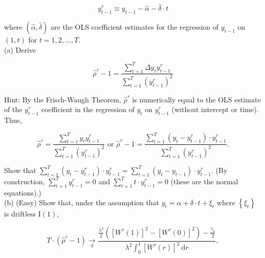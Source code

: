 \documentclass[10pt]{article}
\begin{document}
\begin{equation*}
y_{t-1}^{\tau} \equiv y_{t-1}-\hat{\alpha}-\hat{\delta} \cdot t \tag{8}
\end{equation*}


where $(\hat{\alpha}, \hat{\delta})$ are the OLS coefficient estimates for the regression of $y_{t-1}$ on $(1, t)$ for $t=1,2, \ldots, T$.\\
(a) Derive


\begin{equation*}
\hat{\rho}^{\tau}-1=\frac{\sum_{t=1}^{T} \Delta y_{t} y_{t-1}^{\tau}}{\sum_{t=1}^{T}\left(y_{t-1}^{\tau}\right)^{2}} \tag{9}
\end{equation*}


Hint: By the Frisch-Waugh Theorem, $\hat{\rho}^{\tau}$ is numerically equal to the OLS estimate of the $y_{t-1}^{\tau}$ coefficient in the regression of $y_{t}$ on $y_{t-1}^{\tau}$ (without intercept or time). Thus,


\begin{equation*}
\hat{\rho}^{\tau}=\frac{\sum_{t=1}^{T} y_{t} y_{t-1}^{\tau}}{\sum_{t=1}^{T}\left(y_{t-1}^{\tau}\right)^{2}} \text { or } \hat{\rho}^{\tau}-1=\frac{\sum_{t=1}^{T}\left(y_{t}-y_{t-1}^{\tau}\right) \cdot y_{t-1}^{\tau}}{\sum_{t=1}^{T}\left(y_{t-1}^{\tau}\right)^{2}} . \tag{10}
\end{equation*}


Show that $\sum_{t=1}^{T}\left(y_{t}-y_{t-1}^{\tau}\right) \cdot y_{t-1}^{\tau}=\sum_{t=1}^{T}\left(y_{t}-y_{t-1}\right) \cdot y_{t-1}^{\tau}$. (By construction, $\sum_{t=1}^{T} y_{t-1}^{\tau}=0$ and $\sum_{t=1}^{T} t \cdot y_{t-1}^{\tau}=0$ (these are the normal equations).)\\
(b) (Easy) Show that, under the assumption that $y_{t}=\alpha+\delta \cdot t+\xi_{t}$ where $\left\{\xi_{t}\right\}$ is driftless $\mathrm{I}(1)$,


\begin{equation*}
T \cdot\left(\hat{\rho}^{\tau}-1\right) \underset{\mathrm{d}}{\rightarrow} \frac{\frac{\lambda^{2}}{2}\left(\left[W^{\tau}(1)\right]^{2}-\left[W^{\tau}(0)\right]^{2}\right)-\frac{\gamma_{0}}{2}}{\lambda^{2} \int_{0}^{1}\left[W^{\tau}(r)\right]^{2} \mathrm{~d} r}, \tag{11}
\end{equation*}
\end{document}

